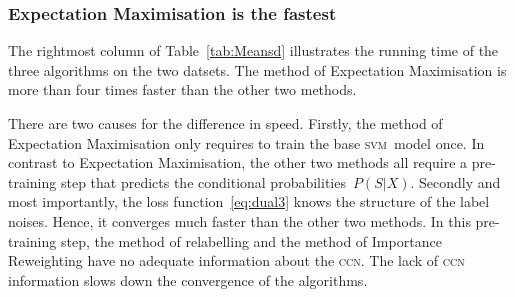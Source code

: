 \documentclass[12pt]{article} %
\newcommand{\svm}{\textsc{svm}}
\begin{document}
\subsubsection{Expectation Maximisation is the fastest}
The rightmost column of Table~\ref{tab:Meansd} illustrates the running time of the three algorithms on the two datsets.
The method of Expectation Maximisation is more than four times faster than the other two methods.

There are two  causes for the difference in speed.
Firstly, the method of Expectation Maximisation only requires to train the base \svm\ model once.
In contrast to Expectation Maximisation, the other two methods all require a pre-training step that predicts the conditional probabilities~$P(S|X)$.
Secondly and most importantly, the loss function~\eqref{eq:dual3} knows the structure of the label noises. Hence, it converges much faster than the other two methods.
In this pre-training step, the method of relabelling and the method of Importance Reweighting have no adequate information about the \textsc{ccn}.
The lack of \textsc{ccn} information slows down the convergence of the algorithms.
\end{document}
